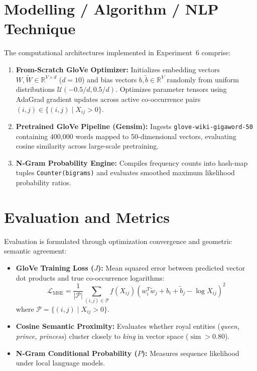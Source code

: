 \documentclass[12pt,a4paper]{report}
\begin{document}
\section{Modelling / Algorithm / NLP Technique}
The computational architectures implemented in Experiment~6 comprise:
\begin{enumerate}
    \item \textbf{From-Scratch GloVe Optimizer:} Initializes embedding vectors $W, \tilde{W} \in \mathbb{R}^{V \times d}$ ($d=10$) and bias vectors $b, \tilde{b} \in \mathbb{R}^V$ randomly from uniform distributions $\mathcal{U}(-0.5/d, 0.5/d)$. Optimizes parameter tensors using AdaGrad gradient updates across active co-occurrence pairs $(i, j) \in \{(i, j) \mid X_{ij} > 0\}$.
    \item \textbf{Pretrained GloVe Pipeline (Gensim):} Ingests \texttt{glove-wiki-gigaword-50} containing 400,000 words mapped to 50-dimensional vectors, evaluating cosine similarity across large-scale pretraining.
    \item \textbf{N-Gram Probability Engine:} Compiles frequency counts into hash-map tuples \texttt{Counter(bigrams)} and evaluates smoothed maximum likelihood probability ratios.
\end{enumerate}

\section{Evaluation and Metrics}
Evaluation is formulated through optimization convergence and geometric semantic agreement:
\begin{itemize}
    \item \textbf{GloVe Training Loss ($J$):} Mean squared error between predicted vector dot products and true co-occurrence logarithms:
    \begin{equation}
        \mathcal{L}_{\text{MSE}} = \frac{1}{|\mathcal{P}|} \sum_{(i, j) \in \mathcal{P}} f(X_{ij}) (w_i^T \tilde{w}_j + b_i + \tilde{b}_j - \log X_{ij})^2
    \end{equation}
    where $\mathcal{P} = \{(i, j) \mid X_{ij} > 0\}$.
    \item \textbf{Cosine Semantic Proximity:} Evaluates whether royal entities (\textit{queen, prince, princess}) cluster closely to \textit{king} in vector space ($\operatorname{sim} > 0.80$).
    \item \textbf{N-Gram Conditional Probability ($P$):} Measures sequence likelihood under local language models.
\end{itemize}
\end{document}
